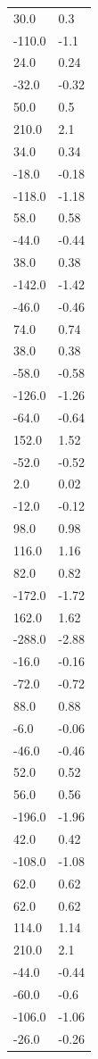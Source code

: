 \begin{longtable}{ll}
30.0 & 0.3 \\
-110.0 & -1.1 \\
24.0 & 0.24 \\
-32.0 & -0.32 \\
50.0 & 0.5 \\
210.0 & 2.1 \\
34.0 & 0.34 \\
-18.0 & -0.18 \\
-118.0 & -1.18 \\
58.0 & 0.58 \\
-44.0 & -0.44 \\
38.0 & 0.38 \\
-142.0 & -1.42 \\
-46.0 & -0.46 \\
74.0 & 0.74 \\
38.0 & 0.38 \\
-58.0 & -0.58 \\
-126.0 & -1.26 \\
-64.0 & -0.64 \\
152.0 & 1.52 \\
-52.0 & -0.52 \\
2.0 & 0.02 \\
-12.0 & -0.12 \\
98.0 & 0.98 \\
116.0 & 1.16 \\
82.0 & 0.82 \\
-172.0 & -1.72 \\
162.0 & 1.62 \\
-288.0 & -2.88 \\
-16.0 & -0.16 \\
-72.0 & -0.72 \\
88.0 & 0.88 \\
-6.0 & -0.06 \\
-46.0 & -0.46 \\
52.0 & 0.52 \\
56.0 & 0.56 \\
-196.0 & -1.96 \\
42.0 & 0.42 \\
-108.0 & -1.08 \\
62.0 & 0.62 \\
62.0 & 0.62 \\
114.0 & 1.14 \\
210.0 & 2.1 \\
-44.0 & -0.44 \\
-60.0 & -0.6 \\
-106.0 & -1.06 \\
-26.0 & -0.26 \\

\end{longtable}

